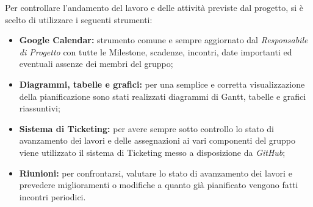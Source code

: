 Per controllare l'andamento del lavoro e delle attività previste dal progetto, si è scelto di utilizzare i seguenti strumenti:
\begin{itemize}
	\item \textbf{Google Calendar:} strumento comune e sempre aggiornato dal \textit{Responsabile di Progetto} con tutte le Milestone, scadenze, incontri, date importanti ed eventuali assenze dei membri del gruppo;
	\item \textbf{Diagrammi, tabelle e grafici:} per una semplice e corretta visualizzazione della pianificazione sono stati realizzati diagrammi di Gantt, tabelle e grafici riassuntivi;
	\item \textbf{Sistema di Ticketing:} per avere sempre sotto controllo lo stato di avanzamento dei lavori e delle assegnazioni ai vari componenti del gruppo viene utilizzato il sistema di Ticketing messo a disposizione da \textit{GitHub};
	\item \textbf{Riunioni:} per confrontarsi, valutare lo stato di avanzamento dei lavori e prevedere miglioramenti o modifiche a quanto già pianificato vengono fatti incontri periodici. 
\end{itemize}
